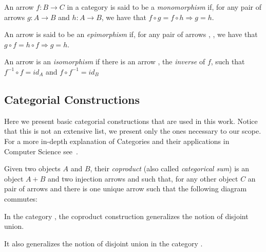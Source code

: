 \begin{definition} An arrow \mbox{$f : B \rightarrow C$} in a category  is said to be a \emph{monomorphism} if, for any pair of arrows $g : A \rightarrow B$ and $h : A \rightarrow B$, we have that $f \circ g = f \circ h \Rightarrow g = h$.


  An arrow  is said to be an \emph{epimorphism} if, for any pair of arrows , , we have that \mbox{$g \circ f = h \circ f \Rightarrow g = h$}.


  An arrow  is an \emph{isomorphism} if there is an arrow , the \emph{inverse} of $f$, such that \mbox{$f^{-1} \circ f = id_A$} and \mbox{$f \circ f^{-1} = id_B$}


\end{definition}

\begin{example}
\end{example}


\subsection{Categorial Constructions}

Here we present basic categorial constructions that are used in this work. Notice that this is not an extensive list, we present only the ones necessary to our scope. For a more in-depth explanation of Categories and their applications in Computer Science see~\cite{Pierce1991}.


\begin{definition}[Coproduct] Given two objects $A$ and $B$, their \emph{coproduct} (also called \emph{categorical sum}) is an object $A+B$ and two injection arrows   and  such that, for any other object $C$ an pair of arrows  and  there is one unique arrow  such that the following diagram commutes:


  \begin{example} In the category , the coproduct construction generalizes the notion of disjoint union. 

    It also generalizes the notion of disjoint union in the category . 
\end{example}

\end{definition}

